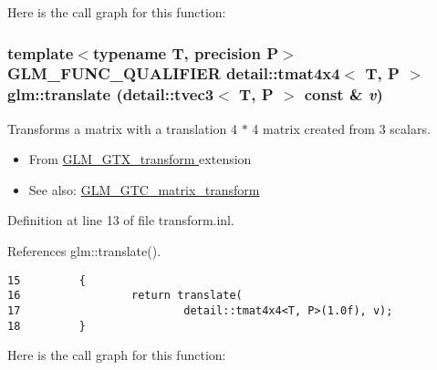 Here is the call graph for this function:\hypertarget{group__gtx__transform_gc06efbcc43ab431cf6ae1ba0e6f03e86}{
\subsubsection[translate]{\setlength{\rightskip}{0pt plus 5cm}template$<$typename T, precision P$>$ GLM\_\-FUNC\_\-QUALIFIER detail::tmat4x4$<$ T, P $>$ glm::translate (detail::tvec3$<$ T, P $>$ const \& {\em v})}}
\label{group__gtx__transform_gc06efbcc43ab431cf6ae1ba0e6f03e86}


Transforms a matrix with a translation 4 $\ast$ 4 matrix created from 3 scalars.\begin{itemize}
\item From \hyperlink{group__gtx__transform}{GLM\_\-GTX\_\-transform } extension\item See also: \hyperlink{group__gtc__matrix__transform_gb05e6ebabf535a3d8f9d9bfc3df45143}{GLM\_\-GTC\_\-matrix\_\-transform } \end{itemize}


Definition at line 13 of file transform.inl.

References glm::translate().

\begin{Code}\begin{verbatim}15         {
16                 return translate(
17                         detail::tmat4x4<T, P>(1.0f), v);
18         }
\end{verbatim}
\end{Code}




Here is the call graph for this function: